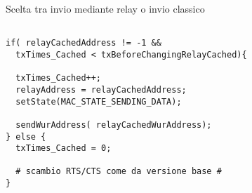 \begin{listing}[h]
    \caption{Scelta tra invio mediante relay o invio classico}
    \label{code:checkForRelay}
    \begin{verbatim}

if( relayCachedAddress != -1 && 
  txTimes_Cached < txBeforeChangingRelayCached){
	
  txTimes_Cached++;
  relayAddress = relayCachedAddress;	
  setState(MAC_STATE_SENDING_DATA);

  sendWurAddress( relayCachedWurAddress);
} else {
  txTimes_Cached = 0;
		
  # scambio RTS/CTS come da versione base #
}

    \end{verbatim}
\end{listing}